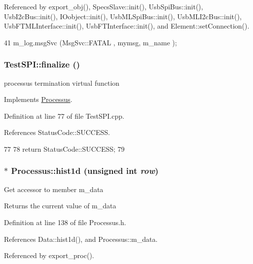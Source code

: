 Referenced by export\_\-obj(), SpecsSlave::init(), UsbSpiBus::init(), UsbI2cBus::init(), IOobject::init(), UsbMLSpiBus::init(), UsbMLI2cBus::init(), UsbFTMLInterface::init(), UsbFTInterface::init(), and Element::setConnection().


\begin{DoxyCode}
41 { m_log.msgSvc (MsgSvc::FATAL   , mymsg, m_name ); }
\end{DoxyCode}
\hypertarget{classTestSPI_aa07f9e513271f933a9166226505779b0}{
\subsubsection[{finalize}]{ TestSPI::finalize ()}}
\label{classTestSPI_aa07f9e513271f933a9166226505779b0}
processus termination virtual function 

Implements \hyperlink{classProcessus_aba93d691f031bdb18ae4b8afb1b2e856}{Processus}.

Definition at line 77 of file TestSPI.cpp.

References StatusCode::SUCCESS.


\begin{DoxyCode}
77                                {  
78   return StatusCode::SUCCESS;
79 }
\end{DoxyCode}
\hypertarget{classProcessus_a409227db936baff03c0462c1bcfe8069}{
\subsubsection[{hist1d}]{$\ast$ Processus::hist1d (unsigned int {\em row})}}
\label{classProcessus_a409227db936baff03c0462c1bcfe8069}
Get accessor to member m\_\-data \begin{DoxyReturn}{Returns}
the current value of m\_\-data 
\end{DoxyReturn}


Definition at line 138 of file Processus.h.

References Data::hist1d(), and Processus::m\_\-data.

Referenced by export\_\-proc().


